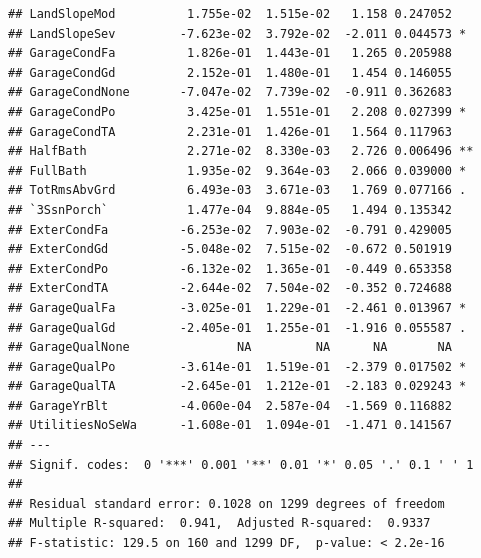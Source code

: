 \documentclass[american,]{article}
\newenvironment{Shaded}{\begin{snugshade}}{\end{snugshade}}
\newcommand{\NormalTok}[1]{#1}
\newcommand{\OperatorTok}[1]{\textcolor[rgb]{0.81,0.36,0.00}{\textbf{#1}}}
\theoremstyle{definition}
\theoremstyle{definition}
\theoremstyle{definition}
\theoremstyle{remark}
\begin{document}
\begin{verbatim}
## LandSlopeMod          1.755e-02  1.515e-02   1.158 0.247052    
## LandSlopeSev         -7.623e-02  3.792e-02  -2.011 0.044573 *  
## GarageCondFa          1.826e-01  1.443e-01   1.265 0.205988    
## GarageCondGd          2.152e-01  1.480e-01   1.454 0.146055    
## GarageCondNone       -7.047e-02  7.739e-02  -0.911 0.362683    
## GarageCondPo          3.425e-01  1.551e-01   2.208 0.027399 *  
## GarageCondTA          2.231e-01  1.426e-01   1.564 0.117963    
## HalfBath              2.271e-02  8.330e-03   2.726 0.006496 ** 
## FullBath              1.935e-02  9.364e-03   2.066 0.039000 *  
## TotRmsAbvGrd          6.493e-03  3.671e-03   1.769 0.077166 .  
## `3SsnPorch`           1.477e-04  9.884e-05   1.494 0.135342    
## ExterCondFa          -6.253e-02  7.903e-02  -0.791 0.429005    
## ExterCondGd          -5.048e-02  7.515e-02  -0.672 0.501919    
## ExterCondPo          -6.132e-02  1.365e-01  -0.449 0.653358    
## ExterCondTA          -2.644e-02  7.504e-02  -0.352 0.724688    
## GarageQualFa         -3.025e-01  1.229e-01  -2.461 0.013967 *  
## GarageQualGd         -2.405e-01  1.255e-01  -1.916 0.055587 .  
## GarageQualNone               NA         NA      NA       NA    
## GarageQualPo         -3.614e-01  1.519e-01  -2.379 0.017502 *  
## GarageQualTA         -2.645e-01  1.212e-01  -2.183 0.029243 *  
## GarageYrBlt          -4.060e-04  2.587e-04  -1.569 0.116882    
## UtilitiesNoSeWa      -1.608e-01  1.094e-01  -1.471 0.141567    
## ---
## Signif. codes:  0 '***' 0.001 '**' 0.01 '*' 0.05 '.' 0.1 ' ' 1
## 
## Residual standard error: 0.1028 on 1299 degrees of freedom
## Multiple R-squared:  0.941,  Adjusted R-squared:  0.9337 
## F-statistic: 129.5 on 160 and 1299 DF,  p-value: < 2.2e-16
\end{verbatim}

\begin{Shaded}
\end{Shaded}
\end{document}
